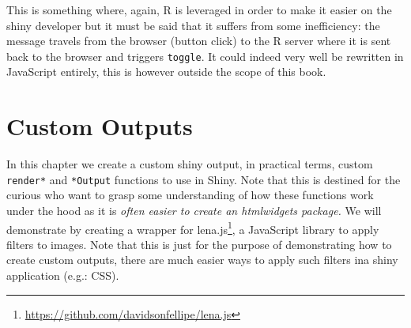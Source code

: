 \documentclass[
]{krantz}
\makeatletter
\newenvironment{Shaded}{\begin{snugshade}}{\end{snugshade}}
\newcommand{\ControlFlowTok}[1]{\textcolor[rgb]{0.27,0.27,0.27}{\textbf{#1}}}
\newcommand{\DataTypeTok}[1]{\textcolor[rgb]{0.27,0.27,0.27}{#1}}
\newcommand{\KeywordTok}[1]{\textcolor[rgb]{0.27,0.27,0.27}{\textbf{#1}}}
\newcommand{\NormalTok}[1]{#1}
\newcommand{\OperatorTok}[1]{\textcolor[rgb]{0.43,0.43,0.43}{\textbf{#1}}}
\newcommand{\StringTok}[1]{\textcolor[rgb]{0.5,0.5,0.5}{#1}}
\renewcommand{\href}[2]{#2\footnote{\url{#1}}}
\newenvironment{kframe}{%
\medskip{}
\setlength{\fboxsep}{.8em}
 \def\at@end@of@kframe{}%
 \ifinner\ifhmode%
  \def\at@end@of@kframe{\end{minipage}}%
  \begin{minipage}{\columnwidth}%
 \fi\fi%
 \def\FrameCommand##1{\hskip\@totalleftmargin \hskip-\fboxsep
 \colorbox{shadecolor}{##1}\hskip-\fboxsep
     \hskip-\linewidth \hskip-\@totalleftmargin \hskip\columnwidth}%
 \MakeFramed {\advance\hsize-\width
   \@totalleftmargin\z@ \linewidth\hsize
   \@setminipage}}%
 {\par\unskip\endMakeFramed%
 \at@end@of@kframe}
\renewenvironment{Shaded}{\begin{kframe}}{\end{kframe}}
\makeatother
\begin{document}
\begin{Shaded}
\end{Shaded}

This is something where, again, R is leveraged in order to make it easier on the shiny developer but it must be said that it suffers from some inefficiency: the message travels from the browser (button click) to the R server where it is sent back to the browser and triggers \texttt{toggle}. It could indeed very well be rewritten in JavaScript entirely, this is however outside the scope of this book.

\hypertarget{custom-outputs}{%
\chapter{Custom Outputs}\label{custom-outputs}}

In this chapter we create a custom shiny output, in practical terms, custom \texttt{render*} and \texttt{*Output} functions to use in Shiny. Note that this is destined for the curious who want to grasp some understanding of how these functions work under the hood as it is \emph{often easier to create an htmlwidgets package.}
We will demonstrate by creating a wrapper for \href{https://github.com/davidsonfellipe/lena.js}{lena.js}, a JavaScript library to apply filters to images. Note that this is just for the purpose of demonstrating how to create custom outputs, there are much easier ways to apply such filters ina shiny application (e.g.: CSS).
\end{document}
